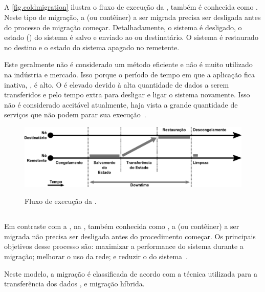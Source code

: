 \subsection{\Coldmigration}\label{sec.coldmigration}
A \autoref{fig.coldmigration} ilustra o fluxo de execução da \coldmigration, também é conhecida como \nonlivemigration. Neste tipo de migração, a \vm (ou contêiner) a ser migrada precisa ser desligada antes do processo de migração começar. Detalhadamente, o sistema é desligado, o estado (\checkpoint) do sistema é salvo e enviado ao \so ou \vm destinatário. O sistema é restaurado no destino e o estado do sistema apagado no remetente.

Este geralmente não é considerado um método eficiente e não é muito utilizado na indústria e mercado. Isso porque o período de tempo em que a aplicação fica inativa, \aka \downtime, é alto. O \downtime é elevado devido à alta quantidade de dados a serem transferidos e pelo tempo extra para desligar e ligar o sistema novamente. Isso não é considerado aceitável atualmente, haja vista a grande quantidade de serviços que não podem parar sua execução~\cite{singh2022predictive, imran2022live}.

\begin{figure}[bt]
    \centering
    \caption{Fluxo de execução da \coldmigration.}
    \includegraphics[width=0.8\linewidth]{content/images/cold-migration-flow.pdf}
    \label{fig.coldmigration}
\end{figure}

\subsection{\Hotmigration}\label{sec.hotmigration}
Em contraste com a \coldmigration, na \hotmigration, também conhecida como \livemigration, a \vm (ou contêiner) a ser migrada não precisa ser desligada antes do procedimento começar. Os principais objetivos desse processo são: maximizar a performance do sistema durante a migração; melhorar o uso da rede; e reduzir o \downtime do sistema~\cite{imran2022live}.

Neste modelo, a migração é classificada de acordo com a técnica utilizada para a transferência dos dados \ie \precopymigration, \postcopymigration e migração híbrida.

